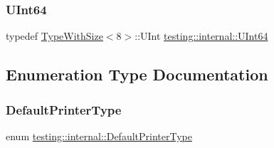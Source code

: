 \mbox{\label{namespacetesting_1_1internal_aa6a1ac454e6d7e550fa4925c62c35caa}} 
\subsubsection{\texorpdfstring{U\+Int64}{UInt64}}
{\footnotesize\ttfamily typedef \hyperlink{classtesting_1_1internal_1_1TypeWithSize}{Type\+With\+Size}$<$8$>$\+::U\+Int \hyperlink{namespacetesting_1_1internal_aa6a1ac454e6d7e550fa4925c62c35caa}{testing\+::internal\+::\+U\+Int64}}



\subsection{Enumeration Type Documentation}
\mbox{\label{namespacetesting_1_1internal_a17fb8f0125fa92404a249ed38a43faa4}} 
\subsubsection{\texorpdfstring{Default\+Printer\+Type}{DefaultPrinterType}}
{\footnotesize\ttfamily enum \hyperlink{namespacetesting_1_1internal_a17fb8f0125fa92404a249ed38a43faa4}{testing\+::internal\+::\+Default\+Printer\+Type}}

